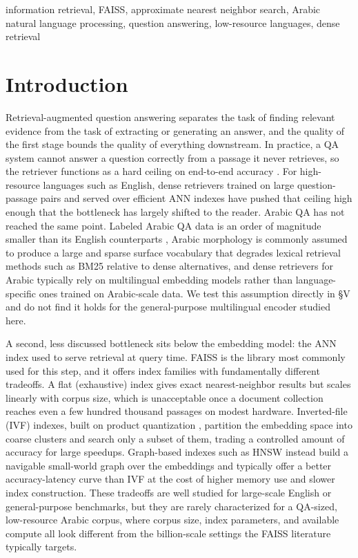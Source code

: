 \documentclass[conference]{IEEEtran}
\begin{document}
\begin{IEEEkeywords}
information retrieval, FAISS, approximate nearest neighbor search, Arabic natural language processing, question answering, low-resource languages, dense retrieval
\end{IEEEkeywords}

\section{Introduction}

Retrieval-augmented question answering separates the task of finding relevant evidence from the task of extracting or generating an answer, and the quality of the first stage bounds the quality of everything downstream. In practice, a QA system cannot answer a question correctly from a passage it never retrieves, so the retriever functions as a hard ceiling on end-to-end accuracy \cite{karpukhin2020dense}. For high-resource languages such as English, dense retrievers trained on large question-passage pairs and served over efficient ANN indexes have pushed that ceiling high enough that the bottleneck has largely shifted to the reader. Arabic QA has not reached the same point. Labeled Arabic QA data is an order of magnitude smaller than its English counterparts \cite{mozannar2019neural}, Arabic morphology is commonly assumed to produce a large and sparse surface vocabulary that degrades lexical retrieval methods such as BM25 \cite{robertson2009probabilistic} relative to dense alternatives, and dense retrievers for Arabic typically rely on multilingual embedding models rather than language-specific ones trained on Arabic-scale data. We test this assumption directly in \S V and do not find it holds for the general-purpose multilingual encoder studied here.

A second, less discussed bottleneck sits below the embedding model: the ANN index used to serve retrieval at query time. FAISS \cite{johnson2019billion} is the library most commonly used for this step, and it offers index families with fundamentally different tradeoffs. A flat (exhaustive) index gives exact nearest-neighbor results but scales linearly with corpus size, which is unacceptable once a document collection reaches even a few hundred thousand passages on modest hardware. Inverted-file (IVF) indexes, built on product quantization \cite{jegou2011product}, partition the embedding space into coarse clusters and search only a subset of them, trading a controlled amount of accuracy for large speedups. Graph-based indexes such as HNSW \cite{malkov2018hnsw} instead build a navigable small-world graph over the embeddings and typically offer a better accuracy-latency curve than IVF at the cost of higher memory use and slower index construction. These tradeoffs are well studied for large-scale English or general-purpose benchmarks, but they are rarely characterized for a QA-sized, low-resource Arabic corpus, where corpus size, index parameters, and available compute all look different from the billion-scale settings the FAISS literature typically targets.
\end{document}
